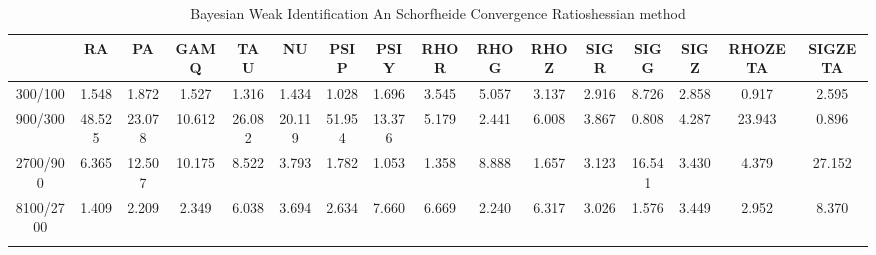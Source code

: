 \documentclass[a4paper,10pt]{article}
\begin{document}
\centering
\begin{longtable}{cccccccccccccccc}
\toprule
 & RA & PA & GAMQ & TAU & NU & PSIP & PSIY & RHOR & RHOG & RHOZ & SIGR & SIGG & SIGZ & RHOZETA & SIGZETA \\
\midrule
300/100 & 1.548 & 1.872 & 1.527 & 1.316 & 1.434 & 1.028 & 1.696 & 3.545 & 5.057 & 3.137 & 2.916 & 8.726 & 2.858 & 0.917 & 2.595 \\
900/300 & 48.525 & 23.078 & 10.612 & 26.082 & 20.119 & 51.954 & 13.376 & 5.179 & 2.441 & 6.008 & 3.867 & 0.808 & 4.287 & 23.943 & 0.896 \\
2700/900 & 6.365 & 12.507 & 10.175 & 8.522 & 3.793 & 1.782 & 1.053 & 1.358 & 8.888 & 1.657 & 3.123 & 16.541 & 3.430 & 4.379 & 27.152 \\
8100/2700 & 1.409 & 2.209 & 2.349 & 6.038 & 3.694 & 2.634 & 7.660 & 6.669 & 2.240 & 6.317 & 3.026 & 1.576 & 3.449 & 2.952 & 8.370 \\
\bottomrule
\caption{Bayesian Weak Identification An Schorfheide Convergence Ratioshessian method}
\label{table:tbl:WeakAnSchoConvergenceRatios_hessian}
\end{longtable}
\end{document}
